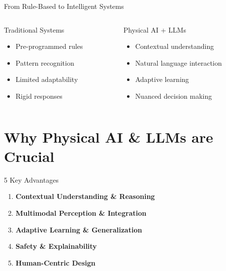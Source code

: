 \documentclass[aspectratio=169]{beamer}
\newcommand{\highlight}[1]{\textcolor{teslaBlue}{\textbf{#1}}}
\begin{document}
\begin{frame}{From Rule-Based to Intelligent Systems}
    \begin{columns}
        \begin{column}{0.5\textwidth}
            \begin{block}{Traditional Systems}
                \begin{itemize}
                    \item Pre-programmed rules
                    \item Pattern recognition
                    \item Limited adaptability
                    \item Rigid responses
                \end{itemize}
            \end{block}
        \end{column}
        \begin{column}{0.5\textwidth}
            \begin{block}{Physical AI + LLMs}
                \begin{itemize}
                    \item Contextual understanding
                    \item Natural language interaction
                    \item Adaptive learning
                    \item Nuanced decision making
                \end{itemize}
            \end{block}
        \end{column}
    \end{columns}
\end{frame}

\section{Why Physical AI \& LLMs are Crucial}

\begin{frame}{5 Key Advantages}
    \begin{enumerate}
        \item \highlight{Contextual Understanding \& Reasoning}
        \item \highlight{Multimodal Perception \& Integration}
        \item \highlight{Adaptive Learning \& Generalization}
        \item \highlight{Safety \& Explainability}
        \item \highlight{Human-Centric Design}
    \end{enumerate}
\end{frame}
\end{document}
